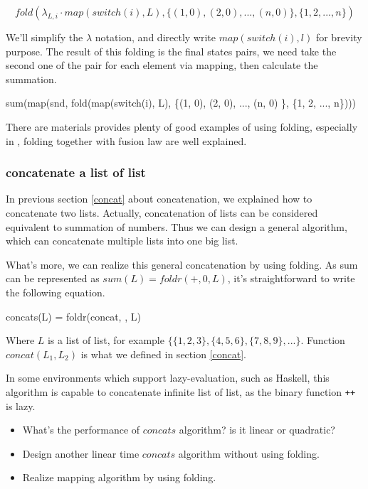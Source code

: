\documentclass[UTF8]{article}
\begin{document}
\[
fold(\lambda_{L, i} \cdot map(switch(i), L), \{(1, 0), (2, 0), ..., (n, 0) \}, \{1, 2, ..., n\})
\]

We'll simplify the $\lambda$ notation, and directly write $map(switch(i), l)$ for brevity purpose.
The result of this folding is the final states pairs, we need take the second one of the pair
for each element via mapping, then calculate the summation.

\be
sum(map(snd, fold(map(switch(i), L), \{(1, 0), (2, 0), ..., (n, 0) \}, \{1, 2, ..., n\})))
\ee

There are materials provides plenty of good examples of using folding, especially in \cite{fp-pearls},
folding together with fusion law are well explained.

\subsubsection{concatenate a list of list}
In previous section \ref{concat} about concatenation, we explained how to concatenate two lists.
Actually, concatenation of lists can be considered equivalent to summation of numbers. Thus we
can design a general algorithm, which can concatenate multiple lists into one big list.

What's more, we can realize this general concatenation by using folding. As sum can be represented
as $sum(L) = foldr(+, 0, L)$, it's straightforward to write the following equation.

\be
concats(L) = foldr(concat, \phi, L)
\ee

Where $L$ is a list of list, for example $\{\{1, 2, 3\}, \{4, 5, 6\}, \{7, 8, 9\}, ...\}$. Function
$concat(L_1, L_2)$ is what we defined in section \ref{concat}.

In some environments which support lazy-evaluation, such as Haskell, this algorithm is capable to
concatenate infinite list of list, as the binary function \verb|++| is lazy.

\begin{Exercise}
\begin{itemize}
\item What's the performance of $concats$ algorithm? is it linear or quadratic?
\item Design another linear time $concats$ algorithm without using folding.
\item Realize mapping algorithm by using folding.
\end{itemize}
\end{Exercise}
\end{document}
